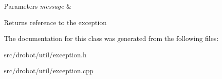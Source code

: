 \begin{DoxyParams}{Parameters}
{\em message} & \\
\hline
\end{DoxyParams}
\begin{DoxyReturn}{Returns}
reference to the exception 
\end{DoxyReturn}


The documentation for this class was generated from the following files\-:\begin{DoxyCompactItemize}
\item 
src/drobot/util/exception.\-h\item 
src/drobot/util/exception.\-cpp\end{DoxyCompactItemize}
